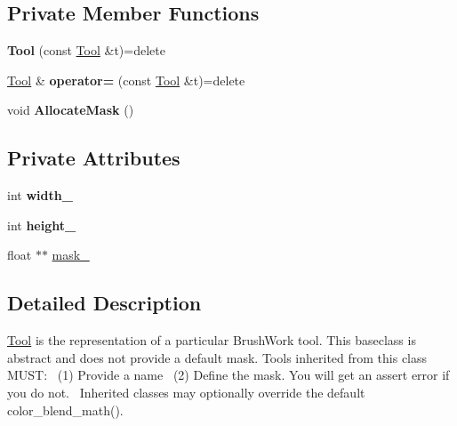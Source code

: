 \subsection*{Private Member Functions}
\begin{DoxyCompactItemize}
\item 
{\bfseries Tool} (const \hyperlink{classTool}{Tool} \&t)=delete\hypertarget{classTool_adc48ba7a9bde5b4abfd50f447091ef76}{}\label{classTool_adc48ba7a9bde5b4abfd50f447091ef76}

\item 
\hyperlink{classTool}{Tool} \& {\bfseries operator=} (const \hyperlink{classTool}{Tool} \&t)=delete\hypertarget{classTool_adb82056c2a3b58a750bb69d9c7fc195d}{}\label{classTool_adb82056c2a3b58a750bb69d9c7fc195d}

\item 
void {\bfseries Allocate\+Mask} ()\hypertarget{classTool_ac76940d0e81ca4aae001983efddc1df0}{}\label{classTool_ac76940d0e81ca4aae001983efddc1df0}

\end{DoxyCompactItemize}
\subsection*{Private Attributes}
\begin{DoxyCompactItemize}
\item 
int {\bfseries width\+\_\+}\hypertarget{classTool_ac1e9a2cc2b6c0b615dbe0b6bb5baf148}{}\label{classTool_ac1e9a2cc2b6c0b615dbe0b6bb5baf148}

\item 
int {\bfseries height\+\_\+}\hypertarget{classTool_a65dcbb7d3bff1259976563380b8ab805}{}\label{classTool_a65dcbb7d3bff1259976563380b8ab805}

\item 
float $\ast$$\ast$ \hyperlink{classTool_abfb4bad0e97863dd73ba855b39531eb8}{mask\+\_\+}
\end{DoxyCompactItemize}


\subsection{Detailed Description}
\hyperlink{classTool}{Tool} is the representation of a particular Brush\+Work tool. This baseclass is abstract and does not provide a default mask. Tools inherited from this class M\+U\+ST\+:~\newline
(1) Provide a name~\newline
(2) Define the mask. You will get an assert error if you do not.~\newline
Inherited classes may optionally override the default color\+\_\+blend\+\_\+math(). 

